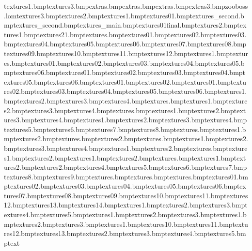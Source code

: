 textures\safaristepstriangles1.bmp textures\reeds3.bmp extras\tazicon.bmp extras\brick.bmp extras\gossamericon.bmp extras\shockwaveadd3.bmp zooboss.lom textures\zoosign3.bmp textures\zoosign2.bmp textures\zoosign1.bmp textures\zoorails01.bmp textures\zoohub_second.bmp textures\zooboss_second.bmp textures\zooboss_main.bmp textures\zoobosstree01final.bmp textures\wpaperfish2.bmp textures\wpaperfish1.bmp textures\wpaper21.bmp textures\antanae.bmp textures\anvilhuge01.bmp textures\anvilhuge02.bmp textures\anvilhuge03.bmp textures\anvilhuge04.bmp textures\anvilhuge05.bmp textures\anvilhuge06.bmp textures\anvilhuge07.bmp textures\anvilhuge08.bmp textures\anvilhuge09.bmp textures\anvilhuge10.bmp textures\anvilhuge11.bmp textures\anvilhuge12.bmp textures\arch1.bmp textures\arrow.bmp textures\blucage01.bmp textures\blucage02.bmp textures\blucage03.bmp textures\blucage04.bmp textures\blucage05.bmp textures\blucage06.bmp textures\bluhut01.bmp textures\bluhut02.bmp textures\bluhut03.bmp textures\bluhut04.bmp textures\bluhut05.bmp textures\bluhut06.bmp textures\bluhutdoor01.bmp textures\bluhutdoor02.bmp textures\bluhutwin01.bmp textures\bluhutwin02.bmp textures\bluhutwin03.bmp textures\bluhutwin04.bmp textures\bluhutwin05.bmp textures\bluhutwin06.bmp textures\bridge1.bmp textures\bridge2.bmp textures\bridge3.bmp textures\bridge4.bmp textures\bridgeside.bmp textures\bridgesnow1.bmp textures\bridgesnow2.bmp textures\bridgesnow3.bmp textures\bridgesnow4.bmp textures\bridsidextra.bmp textures\bridsnowedge1.bmp textures\bridsnowedge2.bmp textures\bridsnowedge3.bmp textures\bridsnowedge4.bmp textures\browtree1.bmp textures\browtree2.bmp textures\browtree3.bmp textures\browtree4.bmp textures\browtree5.bmp textures\browtree6.bmp textures\browtree7.bmp textures\browtree8.bmp textures\browtreebig.bmp textures\building1.bmp textures\building2.bmp textures\burgersign.bmp textures\burgersign2.bmp textures\cagebars.bmp textures\cagedoor1.bmp textures\cagedoor2.bmp textures\cagedoor3.bmp textures\cagedoor4.bmp textures\carzywall1.bmp textures\carzywall2.bmp textures\chickleg.bmp textures\clangersign1.bmp textures\clangersign2.bmp textures\cornerwall1.bmp textures\cornerwall2.bmp textures\crackwile.bmp textures\creamwall1.bmp textures\creamwall2.bmp textures\dangeranvils2.bmp textures\dangeranvils4.bmp textures\dangeranvils5.bmp textures\dangeranvils6.bmp textures\dangeranvils7.bmp textures\dangeranvils8.bmp textures\dangeranvils9.bmp textures\dangercross.bmp textures\dangertarget.bmp textures\dangertargetsand.bmp textures\dirttosand01.bmp textures\dirttosand02.bmp textures\dirttosand03.bmp textures\dirttosand04.bmp textures\dirttosand05.bmp textures\dirttosand06.bmp textures\dirttosand07.bmp textures\dirttosand08.bmp textures\dirttosand09.bmp textures\dirttosand10.bmp textures\dirttosand11.bmp textures\dirttosand12.bmp textures\dirttosand13.bmp textures\dirttosand14.bmp textures\earth1.bmp textures\earth2.bmp textures\earth3.bmp textures\earth4.bmp textures\earth5.bmp textures\eartskel1.bmp textures\eartskel2.bmp textures\eartskel3.bmp textures\elecbox1.bmp textures\elecbox2.bmp textures\elecbox3.bmp textures\elechut1.bmp textures\elechut10.bmp textures\elechut11.bmp textures\elechut12.bmp textures\elechut13.bmp textures\elechut2.bmp textures\elechut3.bmp textures\elechut4.bmp textures\elechut5.bmp text